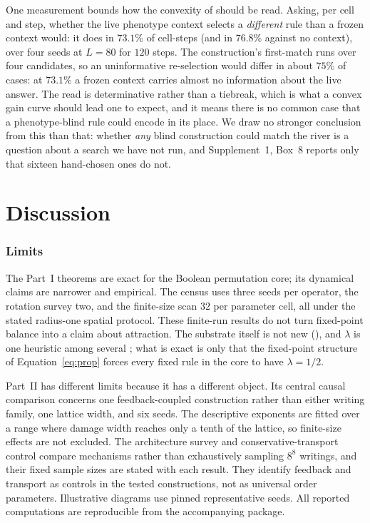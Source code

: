 \documentclass[man,12pt,floatsintext,donotrepeattitle]{apa7}
\newcommand{\secref}[1]{\emph{\nameref{#1}}}
\newcommand{\suppfindingref}[1]{Supplement~1, Box~#1}
\begin{document}
One measurement bounds how the convexity of \secref{sec:gain} should be read.
Asking, per cell and step, whether the live phenotype context selects a
\emph{different} rule than a frozen context would: it does in $73.1$\% of
cell-steps (and in $76.8$\% against no context), over four seeds at $L=80$ for
$120$ steps. The construction's first-match runs over four candidates, so an
uninformative re-selection would differ in about $75$\% of cases: at $73.1$\% a
frozen context carries almost no information about the live answer. The read is
determinative rather than a tiebreak, which is what a convex gain curve should
lead one to expect, and it means there is no common case that a
phenotype-blind rule could encode in its place. We draw no stronger conclusion
from this than that: whether \emph{any} blind construction could match the
river is a question about a search we have not run, and
\suppfindingref{8} reports only that sixteen hand-chosen ones do not.



\part*{Discussion}
\label{part:discussion}

\section{Limits}
\label{sec:limits}

The Part~I theorems are exact for the Boolean permutation core; its dynamical
claims are narrower and empirical. The census uses three seeds per operator,
the rotation survey two, and the finite-size scan $32$ per parameter cell, all
under the stated radius-one spatial protocol. These finite-run results do not
turn fixed-point balance into a claim about attraction. The substrate itself is
not new (\secref{sec:object}), and $\lambda$ is one heuristic among several
\parencite{wuensche1999classifying}; what is exact is only that the fixed-point
structure of Equation~\eqref{eq:prop} forces every fixed rule in the core to
have $\lambda=1/2$.

Part~II has different limits because it has a different object. Its central
causal comparison concerns one feedback-coupled construction rather than
either writing family, one lattice width, and six seeds. The descriptive
exponents are fitted over a range where damage width reaches only a tenth of
the lattice, so finite-size effects are not excluded. The architecture survey
and conservative-transport control compare mechanisms rather than exhaustively
sampling $8^8$ writings, and their fixed sample sizes are stated with each
result. They identify feedback and transport as controls in the tested
constructions, not as universal order parameters. Illustrative diagrams use
pinned representative seeds. All reported computations are reproducible from
the accompanying package.
\end{document}
